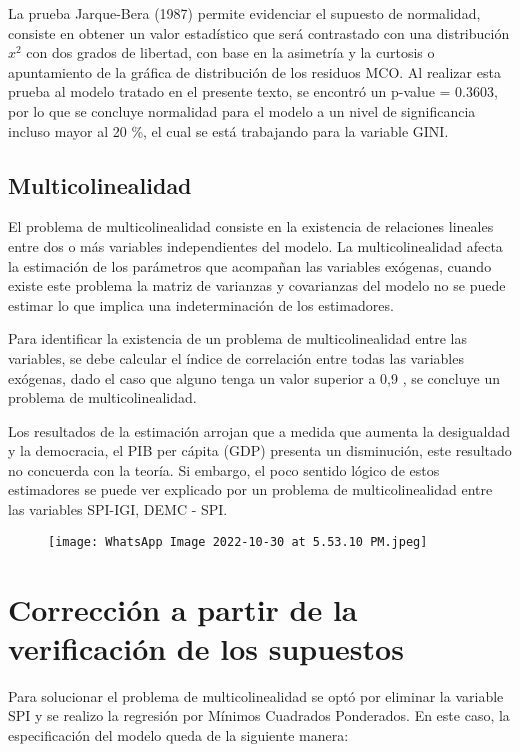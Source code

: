 \documentclass[11pt]{article}
\begin{document}
{La prueba Jarque-Bera (1987) permite evidenciar el supuesto de normalidad, consiste en obtener un valor estadístico que será contrastado con una distribución $x^2$ con dos grados de libertad, con base en la asimetría y la curtosis o apuntamiento de la gráfica de distribución de los residuos MCO. Al realizar esta prueba al modelo tratado en el presente texto, se encontró un p-value = 0.3603, por lo que se concluye normalidad para el modelo a un nivel de significancia incluso mayor al 20 \%, el cual se está trabajando para la variable GINI.

\subsection{Multicolinealidad}

El problema de multicolinealidad consiste en la existencia de relaciones lineales entre dos o más variables independientes del modelo. La multicolinealidad afecta la estimación de los parámetros que acompañan las variables exógenas, cuando existe este problema la matriz de varianzas y covarianzas del modelo no se puede estimar lo que implica una indeterminación de los estimadores.

Para identificar la existencia de un problema de multicolinealidad entre las variables, se debe calcular el índice de correlación entre todas las variables exógenas, dado el caso que alguno tenga un valor superior a 0,9 , se concluye un problema de multicolinealidad.

Los resultados de la estimación arrojan que a medida que aumenta la desigualdad y la democracia, el PIB per cápita (GDP) presenta un disminución, este resultado no concuerda con la teoría. Si embargo, el poco sentido lógico de estos estimadores se puede ver explicado por un problema de multicolinealidad entre las variables SPI-IGI, DEMC - SPI.

  \begin{figure}[H]
    \centering
    \texttt{[image: WhatsApp Image 2022-10-30 at 5.53.10 PM.jpeg]}
    \caption{}
    \label{fig:my_label}
\end{figure}

\section{Corrección a partir de la verificación de los supuestos}

Para solucionar el problema de multicolinealidad se optó por eliminar la variable SPI y se realizo la regresión por Mínimos Cuadrados Ponderados. En este caso, la especificación del modelo queda de la siguiente manera:

}
\end{document}
